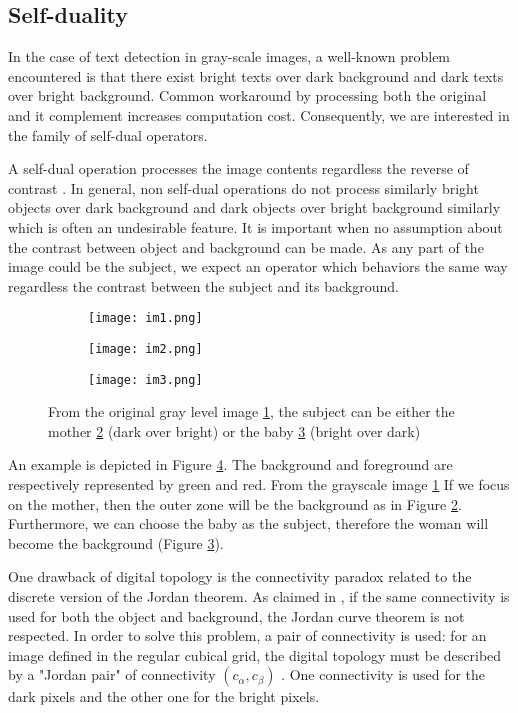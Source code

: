 \subsection{Self-duality}
\par 
In the case of text detection in gray-scale images, a well-known problem encountered is that there exist bright texts over dark background and dark texts over bright background. Common workaround by processing both the original and it complement increases computation cost. Consequently, we are interested in the family of self-dual operators.
\par
A self-dual operation processes the image contents regardless the reverse of contrast \cite{geraud.15.ismm}. In general,  non self-dual operations do not process similarly bright objects over dark background and dark objects over bright background similarly which is often an undesirable feature. It is important when no assumption about the contrast between object and background can be made. As any part of the image could be the subject, we expect an operator which behaviors the same way regardless the contrast between the subject and its background.  
\begin{figure}

	\begin{subfigure}{0.3\textwidth}
	 	\texttt{[image: im1.png]} \caption{}\label{fig:gray} \end{subfigure}
	\begin{subfigure}{0.3\textwidth}
		\texttt{[image: im2.png]} \caption{}\label{fig:mother} \end{subfigure}
	\begin{subfigure}{0.3\textwidth}
		\texttt{[image: im3.png]} \caption{}\label{fig:baby} \end{subfigure}
	\centering
	\caption[Example of \textit{ subjects} can be either bright over dart or dart over bright] {From the original gray level image \ref{fig:gray}, the subject can be either the mother \ref{fig:mother} (dark over bright) or the baby \ref{fig:baby} (bright over dark) }
	\label{fig:motheAndBaby}
\end{figure}

\par
An example is depicted in Figure \ref{fig:motheAndBaby}. The background and foreground are respectively represented by green and red. From the grayscale image \ref{fig:gray} If we focus on the mother, then the outer zone will be the background as in Figure \ref{fig:mother}. Furthermore, we can choose the baby as the subject, therefore the woman will become the background (Figure \ref{fig:baby}).	
\par
One drawback of digital topology is the connectivity paradox related to the discrete version of the Jordan theorem. As claimed in \cite{Kong:1989:DTI:71397.71400}, if the same connectivity is used for both the object and background, the Jordan curve theorem is not respected. In order to solve this problem, a pair of connectivity is used: for an image defined in the regular cubical grid, the digital topology must be described by a "Jordan pair" of connectivity $(c_\alpha,c_\beta)$ . One connectivity is used for the dark pixels and the other one for the bright pixels. 

